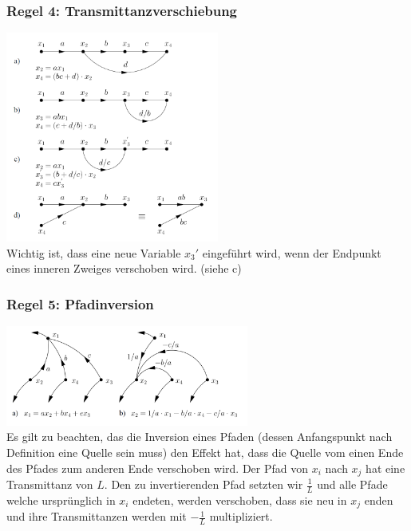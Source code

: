 \begin{multicols}{2}
	      \subsubsection{Regel 4: Transmittanzverschiebung }
	        \includegraphics[width=7cm]{./bilder/transmittanzverschiebung.png} \\
	        Wichtig ist, dass eine neue Variable $x_3'$ eingeführt wird, wenn der Endpunkt eines
	        inneren Zweiges verschoben wird. \newline (siehe c)    
	    \vfill
	    \columnbreak
	    
	      \subsubsection{Regel 5: Pfadinversion }
	        \includegraphics[width=8cm]{./bilder/pfadinversion.png} \\
	        Es gilt zu beachten, das die Inversion eines Pfaden (dessen Anfangspunkt nach Definition
	        eine Quelle sein muss) den Effekt hat, dass die Quelle vom einen Ende des Pfades zum anderen
	        Ende verschoben wird. Der Pfad von $x_i$ nach $x_j$ hat eine Transmittanz von $L$. 
	        Den zu invertierenden Pfad setzten wir $\frac{1}{L}$ und alle Pfade welche ursprünglich in
	        $x_i$ endeten, werden verschoben, dass sie neu in $x_j$ enden und ihre Transmittanzen werden
	        mit $-\frac{1}{L}$ multipliziert.
	        

\end{multicols}
